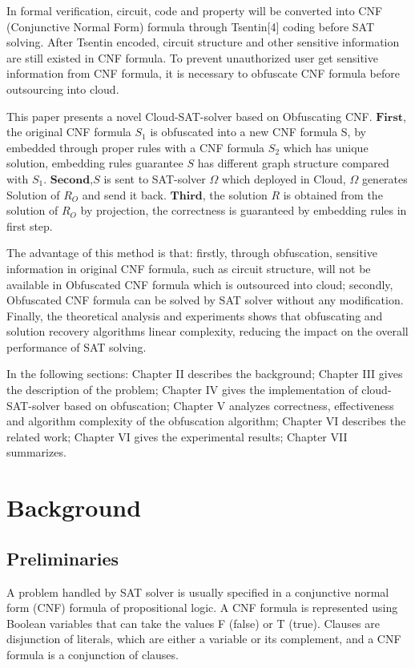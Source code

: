 \documentclass[runningheads,a4paper]{llncs}
\begin{document}
In formal verification, circuit, code and property will be converted into CNF (Conjunctive Normal Form) formula through Tsentin[4] coding before SAT solving. After Tsentin encoded, circuit structure and other sensitive information are still existed in CNF formula. 
To prevent unauthorized user get sensitive information from CNF formula, it is necessary to obfuscate CNF formula before outsourcing into cloud.

This paper presents a novel Cloud-SAT-solver based on Obfuscating CNF. 
$\mathbf{First}$, the original CNF formula $S_1$  is obfuscated into a new CNF formula S, by embedded through proper rules with a CNF formula $S_2$ which has unique solution, 
embedding rules guarantee $S$ has different graph structure compared with $S_1$.
$\mathbf{Second}$,$S$ is sent to SAT-solver $\Omega$ which deployed in Cloud, $\Omega$ generates Solution of $R_O$ and send it back. 
$\mathbf{Third}$, the solution $R$ is obtained from the solution of $R_O$ by projection, the correctness is guaranteed by embedding rules in first step.

The advantage of this method is that: firstly, through obfuscation, sensitive information in original CNF formula, such as circuit structure, will not be available in Obfuscated CNF formula which is outsourced into cloud; secondly, Obfuscated CNF formula can be solved by SAT solver without any modification. Finally, the theoretical analysis and experiments shows that obfuscating and solution recovery algorithms linear complexity, reducing the impact on the overall performance of SAT solving.

In the following sections: Chapter II describes the background; Chapter III gives the description of the problem; Chapter IV gives the implementation of cloud-SAT-solver based on obfuscation; Chapter V analyzes correctness, effectiveness and algorithm complexity of the obfuscation algorithm; Chapter VI describes the related work; Chapter VI gives the experimental results; Chapter VII summarizes.

\section{Background}
\subsection{Preliminaries}

A problem handled by SAT solver is usually specified in a conjunctive normal form (CNF) formula of propositional logic.
A CNF formula is represented using Boolean variables that can take the values F (false) or T (true). 
Clauses are disjunction of literals, which are either a variable or its complement, and a CNF formula is a conjunction of clauses.
\end{document}
